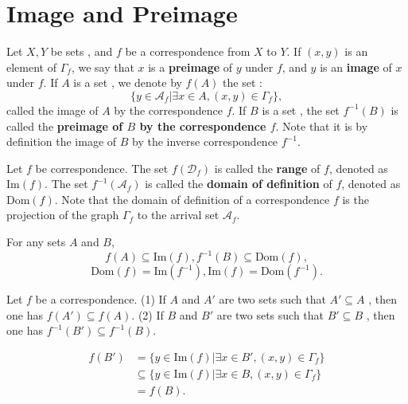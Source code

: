 \section{Image and Preimage}
\begin{definitionenv}
    Let $X, Y$ be sets , and $f$ be a correspondence from $X$ to $Y$. If $(x, y)$ is an element of $\Gamma_f$,  we say that $x$ is a \textbf{preimage } of $y$ under $f$,  and $y$ is an \textbf{image} of $x$ under $f$.
    \newline
    If $A$ is a set ,  we denote by $f(A)$ the set :
    $$\{y\in \mathscr{A}_f|\exists x\in A , (x, y)\in \Gamma_f\}, $$
    called the image of $A$ by the correspondence $f$.
    \newline 
    If $B$ is a set , the set $f^{-1} (B)$ is called the \textbf{preimage of $B$ by the correspondence $f$}. Note that it is by definition the image of $B$ by the inverse correspondence $f^{-1}$.
\end{definitionenv}
\begin{definitionenv}
    Let $f$ be correspondence. The set $f(\mathscr{D}_f)$ is called the \textbf{range} of $f$,  denoted as $\mathrm{Im} (f)$. The set $f^{-1}(\mathscr{A}_f)$ is called the \textbf{domain of definition }of $f$,  denoted as $\mathrm{Dom}( f) $.
    Note that the domain of definition of a correspondence $f$ is the projection of the graph $\Gamma_f$ to the arrival set $\mathscr{A}_f$.
\end{definitionenv}
\begin{box2}
    For any sets $ A$ and $B$, 
$$f(A)\subseteq \mathrm{Im}(f), f^{-1}(B)\subseteq\mathrm{Dom}(f), $$
$$\mathrm{Dom}(f)=\mathrm{Im}(f^{-1}), \mathrm{Im }(f)=\mathrm{Dom}(f^{-1}).$$
\end{box2}
\begin{propositionenv}\label{proposition3.3.1}
    Let $f$ be a correspondence.
    \newline
    (1) If $A$ and $A'$ are two sets such that $A'\subseteq A$ , then one has $f(A')\subseteq f(A)$.
    \newline
    (2) If $B$ and $B'$ are two sets such that $B'\subseteq B$ , then one has $f^{-1}(B')\subseteq f^{-1}(B)$.
\end{propositionenv}
\begin{proofenv}
    \begin{align*}
        f(B')&=\{y\in\mathrm{Im}(f)|\exists x\in B', (x, y)\in \Gamma_f\}\\
        &\subseteq\{y\in\mathrm{Im}(f)|\exists x\in B, (x, y)\in \Gamma_f\}\\
        &=f(B).
    \end{align*}
\end{proofenv}    
